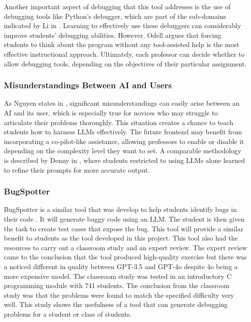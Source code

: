 \documentclass[12pt]{extarticle}
\begin{document}
Another important aspect of debugging that this tool addresses is the use of debugging tools like Python’s debugger, which are part of the sub-domains indicated by Li in \cite{li2019}. Learning to effectively use these debuggers can considerably improve students’ debugging abilities. However, Odell \cite{odell2017} argues that forcing students to think about the program without any tool-assisted help is the most effective instructional approach. Ultimately, each professor can decide whether to allow debugging tools, depending on the objectives of their particular assignment.

\subsubsection{Misunderstandings Between AI and Users}

As Nguyen states in \cite{nguyen2024}, significant misunderstandings can easily arise between an AI and its user, which is especially true for novices who may struggle to articulate their problems thoroughly. This situation creates a chance to teach students how to harness LLMs effectively. The future frontend may benefit from incorporating a co-pilot-like assistance, allowing professors to enable or disable it depending on the complexity level they want to set. A comparable methodology is described by Denny in \cite{denny2023}, where students restricted to using LLMs alone learned to refine their prompts for more accurate output.

\subsubsection{BugSpotter}

BugSpotter is a similar tool that was develop to help students identify bugs in their code \cite{Victor2025}. It will generate buggy code using an LLM. The student is then given the task to create test cases that expose the bug. This tool will provide a similar benefit to students as the tool developed in this project. This tool also had the resources to carry out a classroom study and an expert review. The expert review came to the conclusion that the tool produced high-quality exercise but there was a noticed different in quality between GPT-3.5 and GPT-4o despite 4o being a more expensive model. The classroom study was tested in an introductory C programming module with 741 students. The conclusion from the classroom study was that the problems were found to match the specified difficulty very well. This study shows the usefulness of a tool that can generate debugging problems for a student or class of students.
\end{document}
